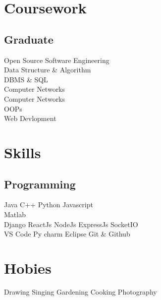 \documentclass[]{deedy-resume-openfont}
\begin{document}
\begin{minipage}[t]{0.33\textwidth}

\section{Coursework}
\subsection{Graduate}
Open Source Software Engineering \\
Data Structure & Algorithm \\
DBMS & SQL \\
Computer Networks \\
Computer Networks\\
OOPs\\
Web Devlopment \\
\sectionsep



\section{Skills}
\subsection{Programming}
Java \textbullet{}   C++ \textbullet{} Python \textbullet{} Javascript \\
 \textbullet{} Matlab \ \\ 
Django \textbullet{} ReactJs \textbullet{} NodeJs \textbullet{} ExpressJs \textbullet{} SocketIO \\
VS Code \textbullet{} Py charm \textbullet{} Eclipse \textbullet{} Git & Github
\sectionsep


\section{Hobies }
Drawing \textbullet{}   Singing \textbullet{} Gardening \textbullet{} Cooking \textbullet{} Photography

%
%

\end{minipage} 
\end{document}
